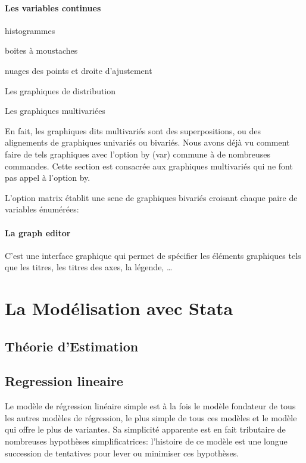 \documentclass[
]{book}
\begin{document}
\hypertarget{les-variables-continues}{%
\subsubsection{Les variables continues}\label{les-variables-continues}}

histogrammes

boites à moustaches

nuages des points et droite d'ajustement

Les graphiques de distribution

Les graphiques multivariées

En fait, les graphiques dits multivariés sont des superpositions,
ou des alignements de graphiques univariés ou bivariés. Nous
avons déjà vu comment faire de tels graphiques avec l'option
by (var) commune à de nombreuses commandes. Cette section
est consacrée aux graphiques multivariés qui ne font pas appel à
l'option by.

L'option matrix établit une sene de graphiques bivariés
croisant chaque paire de variables énumérées:

\hypertarget{la-graph-editor}{%
\subsubsection{La graph editor}\label{la-graph-editor}}

C'est une interface graphique qui permet de spécifier les éléments graphiques tels que les titres, les titres des axes, la légende, \ldots{}

\hypertarget{la-moduxe9lisation-avec-stata}{%
\chapter{La Modélisation avec Stata}\label{la-moduxe9lisation-avec-stata}}

\hypertarget{thuxe9orie-destimation}{%
\section{Théorie d'Estimation}\label{thuxe9orie-destimation}}

\hypertarget{regression-lineaire}{%
\section{Regression lineaire}\label{regression-lineaire}}

Le modèle de régression linéaire simple est à la fois le modèle
fondateur de tous les autres modèles de régression, le plus
simple de tous ces modèles et le modèle qui offre le plus de
variantes. Sa simplicité apparente est en fait tributaire de
nombreuses hypothèses simplificatrices: l'histoire de ce modèle
est une longue succession de tentatives pour lever ou minimiser
ces hypothèses.
\end{document}
